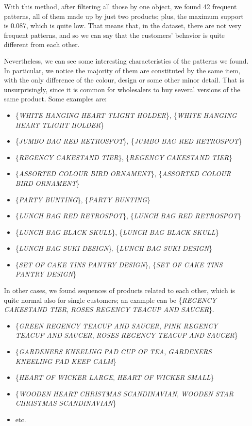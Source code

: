With this method, after filtering all those by one object, we found 42 frequent patterns, all of them made up by just two products; plus, the maximum support is 0.087, which is quite low. That means that, in the dataset, there are not very frequent patterns, and so we can say that the customers' behavior is quite different from each other.

Nevertheless, we can see some interesting characteristics of the patterns we found.\\
In particular, we notice the majority of them are constituted by the same item, with the only difference of the colour, design or some other minor detail. That is unsurprisingly, since it is common for wholesalers to buy several versions of the same product. Some examples are:

\begin{itemize}
\item \{\emph{WHITE HANGING HEART TLIGHT HOLDER}\}, \{\emph{WHITE HANGING HEART TLIGHT HOLDER}\}
\item \{\emph{JUMBO BAG RED RETROSPOT}\}, \{\emph{JUMBO BAG RED RETROSPOT}\}
\item \{\emph{REGENCY CAKESTAND TIER}\}, \{\emph{REGENCY CAKESTAND TIER}\}
\item \{\emph{ASSORTED COLOUR BIRD ORNAMENT}\}, \{\emph{ASSORTED COLOUR BIRD ORNAMENT}\}
\item \{\emph{PARTY BUNTING}\}, \{\emph{PARTY BUNTING}\}
\item \{\emph{LUNCH BAG RED RETROSPOT}\}, \{\emph{LUNCH BAG RED RETROSPOT}\}
\item \{\emph{LUNCH BAG BLACK SKULL}\}, \{\emph{LUNCH BAG BLACK SKULL}\}
\item \{\emph{LUNCH BAG SUKI DESIGN}\}, \{\emph{LUNCH BAG SUKI DESIGN}\}
\item \{\emph{SET OF CAKE TINS PANTRY DESIGN}\}, \{\emph{SET OF CAKE TINS PANTRY DESIGN}\}
\end{itemize}

In other cases, we found sequences of products related to each other, which is quite normal also for single customers; an example can be \{\emph{REGENCY CAKESTAND TIER}, \emph{ROSES REGENCY TEACUP AND SAUCER}\}.

\begin{itemize}
\item \{\emph{GREEN REGENCY TEACUP AND SAUCER}, \emph{PINK REGENCY TEACUP AND SAUCER}, \emph{ROSES REGENCY TEACUP AND SAUCER}\}
\item \{\emph{GARDENERS KNEELING PAD CUP OF TEA}, \emph{GARDENERS KNEELING PAD KEEP CALM}\}
\item \{\emph{HEART OF WICKER LARGE}, \emph{HEART OF WICKER SMALL}\}
\item \{\emph{WOODEN HEART CHRISTMAS SCANDINAVIAN}, \emph{WOODEN STAR CHRISTMAS SCANDINAVIAN}\}
\item etc.
\end{itemize}

